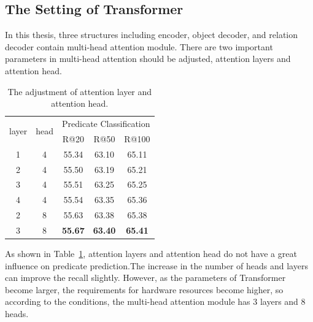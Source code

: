 \subsection{The Setting of Transformer }%
In this thesis, three structures including encoder, object decoder, and relation decoder  contain multi-head attention module. There are two important parameters in multi-head attention should be adjusted, attention layers and attention head.

\begin{table}[H]
	\centering
	\begin{tabular}{cc|ccc}
		\hline
		\multirow{2}{*}{layer} & \multirow{2}{*}{head} & \multicolumn{3}{c}{Predicate Classification} \\ \cline{3-5} 
		&                       & R@20          & R@50          & R@100         \\ \hline
		1                      & 4                     & 55.34         & 63.10         & 65.11         \\
		2                      & 4                     & 55.50         & 63.19         & 65.21         \\
		3                      & 4                     & 55.51         & 63.25         & 65.25         \\
		4                      & 4                     & 55.54         & 63.35         & 65.36         \\
		2                      & 8                     & 55.63         & 63.38         & 65.38         \\
		3                      & 8                     & \textbf{55.67 }        & \textbf{63.40}         & \textbf{65.41}        \\ \hline
	\end{tabular}
\caption[The Setting of Transformer]{The adjustment of attention layer and attention head.} %
\label{tab:transfomerset}
\end{table}

As shown in Table~\ref{tab:transfomerset}, attention layers and attention head do not have a great influence on predicate prediction.The increase in the number of heads and layers can improve the recall slightly. However, as the parameters of Transformer become larger, the requirements for hardware resources become higher, so according to the conditions,  the multi-head attention module has 3 layers and 8 heads.


